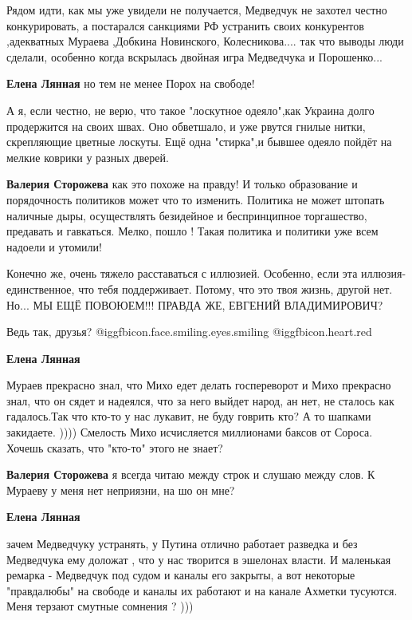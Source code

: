 \begin{itemize}
\begin{itemize}
Рядом идти, как мы уже увидели не получается, Медведчук не захотел честно
конкурировать, а постарался санкциями РФ устранить своих конкурентов ,адекватных
Мураева ,Добкина Новинского, Колесникова.... так что выводы люди сделали, особенно
когда вскрылась двойная игра Медведчука и Порошенко...

\textbf{Елена Лянная} но тем не менее Порох на свободе!


А я, если честно, не верю, что такое "лоскутное одеяло",как Украина долго
продержится на своих швах. Оно обветшало, и уже рвутся гнилые нитки, скрепляющие
цветные лоскуты. Ещё одна "стирка",и бывшее одеяло пойдёт на мелкие коврики у
разных дверей.

\textbf{Валерия Сторожева} как это похоже на правду!
И только образование и порядочность политиков может что то изменить.
Политика не может штопать наличные дыры, осуществлять безидейное и беспринципное торгашество, предавать и гавкаться.
Мелко, пошло ! Такая политика и политики уже всем надоели и утомили!


Конечно же, очень тяжело расставаться с иллюзией. Особенно, если эта иллюзия-
единственное, что тебя поддерживает. Потому, что это твоя жизнь, другой нет. Но... МЫ
ЕЩЁ ПОВОЮЕМ!!! ПРАВДА ЖЕ, ЕВГЕНИЙ ВЛАДИМИРОВИЧ?

Ведь так, друзья? @igg{fbicon.face.smiling.eyes.smiling} @igg{fbicon.heart.red}

\textbf{Елена Лянная} 

Мураев прекрасно знал, что Михо едет делать госпереворот и Михо прекрасно знал,
что он сядет и надеялся, что за него выйдет народ, ан нет, не сталось как
гадалось.Так что кто-то у нас лукавит, не буду говрить кто? А то шапками
закидаете. )))) Смелость Михо исчисляется миллионами баксов от Сороса. Хочешь
сказать, что "кто-то" этого не знает?

\textbf{Валерия Сторожева} я всегда читаю между строк и слушаю между слов. К
Мураеву у меня нет неприязни, на шо он мне?

\textbf{Елена Лянная} 

зачем Медведчуку устранять, у Путина отлично работает разведка и без Медведчука
ему доложат , что у нас творится в эшелонах власти. И маленькая ремарка -
Медведчук под судом и каналы его закрыты, а вот некоторые "правдалюбы" на
свободе и каналы их работают и на канале Ахметки тусуются. Меня терзают смутные
сомнения ? )))


\end{itemize}
\end{itemize}

